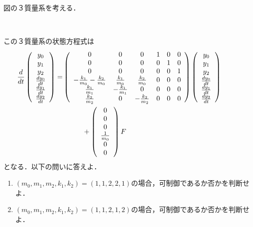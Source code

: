 
\item

図の３質量系を考える．
\begin{center}
\end{center}

この３質量系の状態方程式は
{\footnotesize
\begin{align*} 
\hspace*{-10mm}
 \frac{d}{dt} \left(\begin{array}{c}
	         y_0 \\
		     y_1 \\
		     y_2 \\
		     \frac{dy_0}{dt} \\
		     \frac{dy_1}{dt} \\
		     \frac{dy_2}{dt}
		    \end{array}\right)
 =&
 \left(\begin{array}{cccccc}
        0 & 0 & 0 & 1 & 0 & 0      \\
        0 & 0 & 0 & 0 & 1 & 0      \\
        0 & 0 & 0 & 0 & 0 & 1      \\
	-\frac{k_1}{m_0} -\frac{k_2}{m_0}&  \frac{k_1}{m_0} &  \frac{k_2}{m_0} & 0 & 0 & 0 \\
	 \frac{k_1}{m_1}                & -\frac{k_1}{m_1} &  0               & 0 & 0 & 0 \\
	 \frac{k_2}{m_2}                &  0               & -\frac{k_2}{m_2} & 0 & 0 & 0 
       \end{array}\right)
 \left(\begin{array}{c}
	         y_0 \\
		     y_1 \\
		     y_2 \\
		     \frac{dy_0}{dt} \\
		     \frac{dy_1}{dt} \\
		     \frac{dy_2}{dt}
       \end{array}\right)
\\
 &\hspace*{10mm} +
 \left(\begin{array}{c}
        0 \\
        0 \\
        0 \\
	    \frac{1}{m_0} \\
	    0 \\
	    0 
       \end{array}\right)
        F
\end{align*}
}
となる．以下の問いに答えよ．

\begin{enumerate}
\item 
$(m_0, m_1, m_2, k_1, k_2)=(1,1,2,2,1)$の場合，可制御であるか否かを判断せよ．
\vspace{8cm}

\item
$(m_0, m_1, m_2, k_1, k_2)=(1,1,2,1,2)$の場合，可制御であるか否かを判断せよ．
\vspace{8cm}

\end{enumerate}


